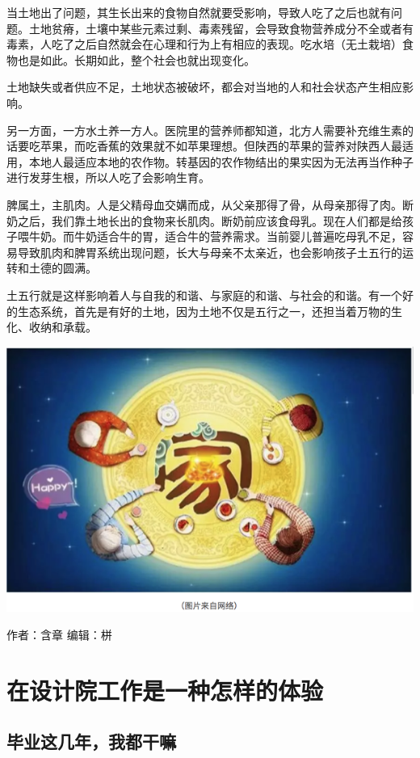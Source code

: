 \documentclass[]{book}
\begin{document}
当土地出了问题，其生长出来的食物自然就要受影响，导致人吃了之后也就有问题。土地贫瘠，土壤中某些元素过剩、毒素残留，会导致食物营养成分不全或者有毒素，人吃了之后自然就会在心理和行为上有相应的表现。吃水培（无土栽培）食物也是如此。长期如此，整个社会也就出现变化。

土地缺失或者供应不足，土地状态被破坏，都会对当地的人和社会状态产生相应影响。

另一方面，一方水土养一方人。医院里的营养师都知道，北方人需要补充维生素的话要吃苹果，而吃香蕉的效果就不如苹果理想。但陕西的苹果的营养对陕西人最适用，本地人最适应本地的农作物。转基因的农作物结出的果实因为无法再当作种子进行发芽生根，所以人吃了会影响生育。

脾属土，主肌肉。人是父精母血交媾而成，从父亲那得了骨，从母亲那得了肉。断奶之后，我们靠土地长出的食物来长肌肉。断奶前应该食母乳。现在人们都是给孩子喂牛奶。而牛奶适合牛的胃，适合牛的营养需求。当前婴儿普遍吃母乳不足，容易导致肌肉和脾胃系统出现问题，长大与母亲不太亲近，也会影响孩子土五行的运转和土德的圆满。

土五行就是这样影响着人与自我的和谐、与家庭的和谐、与社会的和谐。有一个好的生态系统，首先是有好的土地，因为土地不仅是五行之一，还担当着万物的生化、收纳和承载。

\includegraphics[width=8.33in]{images/swr4}

作者：含章 编辑：栟

\section{在设计院工作是一种怎样的体验}

\subsection{毕业这几年，我都干嘛}
\end{document}
